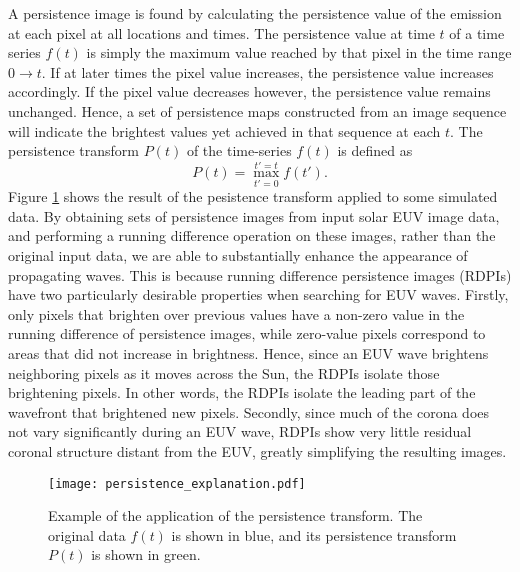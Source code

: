 A persistence image is found by calculating the persistence value of
the emission at each pixel at all locations and times.  The
persistence value at time $t$ of a time series $f(t)$ is simply the
maximum value reached by that pixel in the time range $0\rightarrow
t$.  If at later times the pixel value increases, the persistence
value increases accordingly. If the pixel value decreases however, the
persistence value remains unchanged. Hence, a set of persistence maps
constructed from an image sequence will indicate the brightest values
yet achieved in that sequence at each $t$.  The persistence transform
$P(t)$ of the time-series $f(t)$ is defined as
\begin{equation}
\label{eqn:persisttransform}
P(t) = \max_{t'=0}^{t'=t}f(t').
\end{equation}
Figure \ref{fig:persistence} shows the result of the pesistence
transform applied to some simulated data.  By obtaining sets of
persistence images from input solar EUV image data, and performing a
running difference operation on these images, rather than the original
input data, we are able to substantially enhance the appearance of
propagating waves. This is because running difference persistence
images (RDPIs) have two particularly desirable properties when
searching for EUV waves.  Firstly, only pixels that brighten over
previous values have a non-zero value in the running difference of
persistence images, while zero-value pixels correspond to areas that
did not increase in brightness. Hence, since an EUV wave brightens
neighboring pixels as it moves across the Sun, the RDPIs isolate those
brightening pixels.  In other words, the RDPIs isolate the leading
part of the wavefront that brightened new pixels.  Secondly, since
much of the corona does not vary significantly during an EUV wave,
RDPIs show very little residual coronal structure distant from the
EUV, greatly simplifying the resulting images.

\begin{figure}
\begin{center}
\texttt{[image: persistence\_explanation.pdf]}
\caption{Example of the application of the persistence transform.  The
original data $f(t)$ is shown in blue, and its persistence transform
$P(t)$ is shown in green.}
\label{fig:persistence}
\end{center}
\end{figure}

